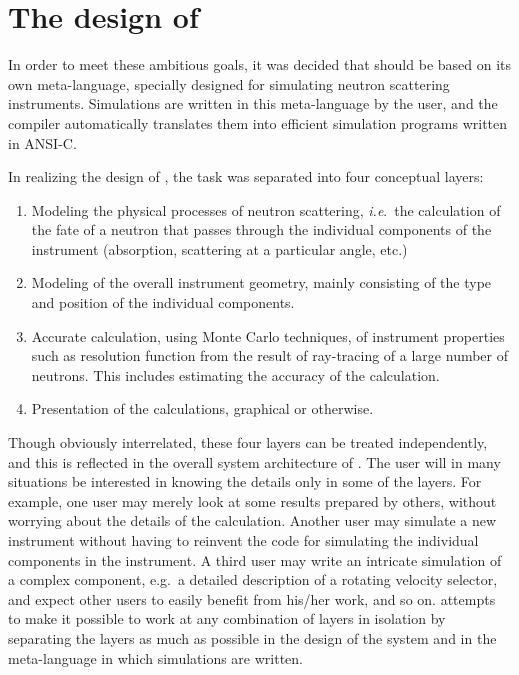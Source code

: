 \section{The design of \MCS}
\label{s:design}

In order to meet these ambitious goals, it was decided that \MCS should
be based on its own meta-language, specially designed for
simulating neutron scattering instruments. Simulations are written in
this meta-language by the user, and the \MCS compiler automatically
translates them into efficient simulation programs written in ANSI-C.

In realizing the design of \MCS, the task was
separated into four conceptual layers:
\begin{enumerate}
\item Modeling the physical processes of neutron scattering, \textit{i.e}.\ 
  the calculation of the fate of a neutron that passes through the
  individual components of the instrument (absorption, scattering at a
  particular angle, etc.)
\item Modeling of the overall instrument geometry, mainly consisting
  of the type and position of the individual components.
\item Accurate calculation, using Monte Carlo techniques, of
  instrument properties such as resolution function from the result of
  ray-tracing of a large number of neutrons. This includes estimating
  the accuracy of the calculation.
\item Presentation of the calculations, graphical or otherwise.
\end{enumerate}

Though obviously interrelated, these four layers can be
treated independently, and this is reflected in the overall system
architecture of \MCS. The user will in many situations be
interested in knowing the details only in some of the layers. For
example, one user may merely look at some results prepared by others,
without worrying about the details of the calculation. Another user
may simulate a new instrument without having to reinvent the
code for simulating the individual components in the instrument. A third
user may write an intricate simulation of a complex component,
e.g.\ a detailed description of a rotating velocity selector, 
and expect other users to easily
benefit from his/her work, and so on. \MCS attempts to make it
possible to work at any combination of layers in isolation by separating
the layers as much as possible in the design of the system and in
the meta-language in which simulations are written.


